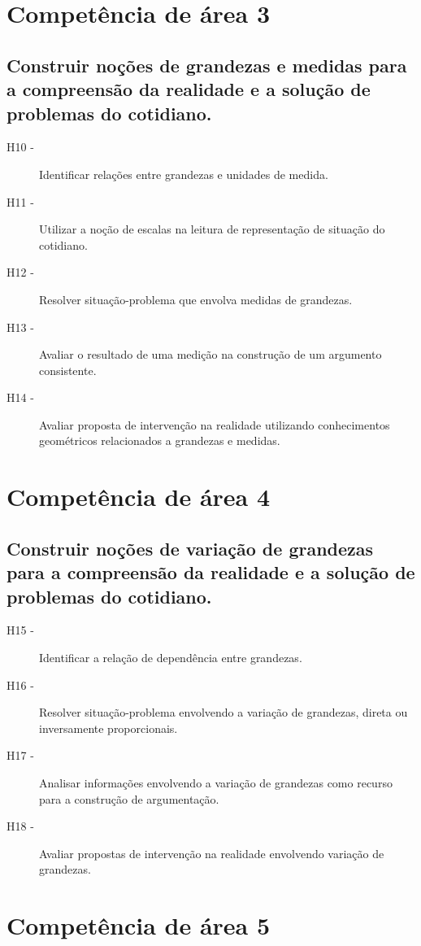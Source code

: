 \section*{Competência de área 3}
    \subsection*{Construir noções de grandezas e medidas para a compreensão da realidade
    	e a solução de problemas do cotidiano.}
    	\begin{description}
    		\item [H10 -]Identificar relações entre grandezas e unidades de medida.
    		\item [H11 -]Utilizar a noção de escalas na leitura de representação de situação do cotidiano.
    		\item [H12 -]Resolver situação-problema que envolva medidas de grandezas.
    		\item [H13 -]Avaliar o resultado de uma medição na construção de um argumento consistente.
    		\item [H14 -]Avaliar proposta de intervenção na realidade utilizando conhecimentos geométricos relacionados a grandezas e medidas.
    	\end{description}

\section*{Competência de área 4}
    \subsection*{Construir noções de variação de grandezas para a compreensão da realidade
    	e a solução de problemas do cotidiano.}
    	\begin{description}
    		\item [H15 -]Identificar a relação de dependência entre grandezas.
    		\item [H16 -]Resolver situação-problema envolvendo a variação de grandezas, direta ou inversamente proporcionais.
    		\item [H17 -]Analisar informações envolvendo a variação de grandezas como recurso para a construção de argumentação.
    		\item [H18 -]Avaliar propostas de intervenção na realidade envolvendo variação de grandezas.
    	\end{description}

\section*{Competência de área 5}
